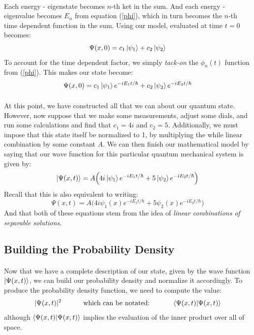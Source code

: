 \documentclass[12pt,letterpaper]{book}
\begin{document}
\paragraph*{}Each energy - eigenstate becomes $n$-th ket in the sum. And each energy - eigenvalue becomes $E_n$ from equation (\ref{phi}), which in turn becomes the $n$-th time dependent function in the sum. Using our model, evaluated at time $t=0$ becomes:
\begin{equation}
\Psi(x,0) = c_1 \ket{\psi_1} + c_2 \ket{\psi_2} 
\end{equation}
To account for the time dependent factor, we simply \textit{tack-on} the $\phi_n(t)$ function from (\ref{phi}). This makes our state become:
\begin{equation}
\Psi(x,0) = c_1 \ket{\psi_1}e^{-iE_1t/\hbar} + c_2 \ket{\psi_2} e^{-iE_2t/\hbar}
\end{equation}
\paragraph*{}At this point, we have constructed all that we can about our quantum state. However, now suppose that we make some measurements, adjust some dials, and run some calculations and find that $c_1 = 4i$ and $c_2 = 5$. Additionally, we must impose that this state itself be normalized to 1, by multiplying the while linear combination by some constant $A$. We can then finish our mathematical model  by saying that our wave function for this particular quantum mechanical system is given by:
\begin{equation}
\label{ex1 sys ket dirac}
\ket{\Psi(x,t)} = A \Big( 4i \ket{\psi_1}e^{-iE_1t/\hbar} + 5 \ket{\psi_2} e^{-iE_2t/\hbar} \Big)
\end{equation}
Recall that this is also equivalent to writing:
\begin{equation}
\label{ex1 sys non-dirac}
\Psi(x,t) =  A \Big( 4i\psi_1(x)e^{-iE_1t/\hbar} + 5\psi_2(x)e^{-iE_2t/\hbar} \Big)
\end{equation}
And that both of these equations stem from the idea of \textit{linear combinations of separable solutions}.


\subsection*{Building the Probability Density}
\paragraph*{}Now that we have a complete description of our state, given by the wave function $\ket{\Psi(x,t)}$, we can build our probability density and normalize it accordingly. To produce the probability density function, we need to compute the value:
\begin{equation}
|\Psi(x,t)|^2 \text{\hspace{1cm} which can be notated: \hspace{1cm}} \braket{\Psi(x,t)}{\Psi(x,t)}
\end{equation}
although $\braket{\Psi(x,t)}{\Psi(x,t)}$ implies the evaluation of the inner product over all of space.
\end{document}
